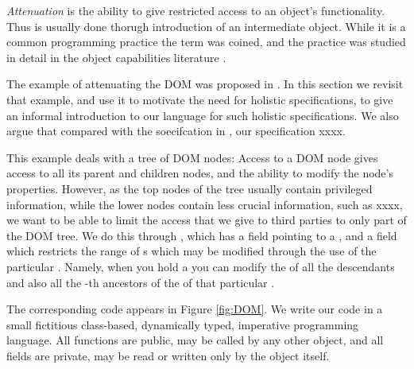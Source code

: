 \emph{Attenuation} is the ability to give restricted access to an object's functionality. Thus is usually done thorugh
introduction of an intermediate object. While it is a common programming practice the term was coined, and the practice 
was studied in detail in the object capabilities literature \cite{millerPhD}. 

The example of attenuating the DOM was proposed in \cite{dd}. 
In this section we revisit that example, and use it to motivate the need for holistic specifications, to give an informal introduction
to  our language for such holistic specifications. We also argue that compared with the soecifcation in \cite{dd}, our specification xxxx.

This example deals with a tree of DOM nodes: Access to a DOM node gives access to all its parent and children nodes, and the ability to modify the node's properties. However, as the top nodes of the tree usually contain privileged information, while the lower nodes contain less crucial information, such as xxxx, we want to be able to limit  the access that we give  to third parties to only part of the DOM tree. We do this through , which has a field  pointing to a , and a field  which restricts the range of s which may be modified through the use of the particular . Namely, when you hold a   you can modify the  of all the descendants    and also all the -th ancestors of the  of that particular .

The corresponding code appears in Figure \ref{fig:DOM}. 
We write our code in a small fictitious class-based, dynamically typed, imperative programming language. All functions are public, \ie may be called by any other object, and all fields are private, \ie may be read or written only by the object itself. 


